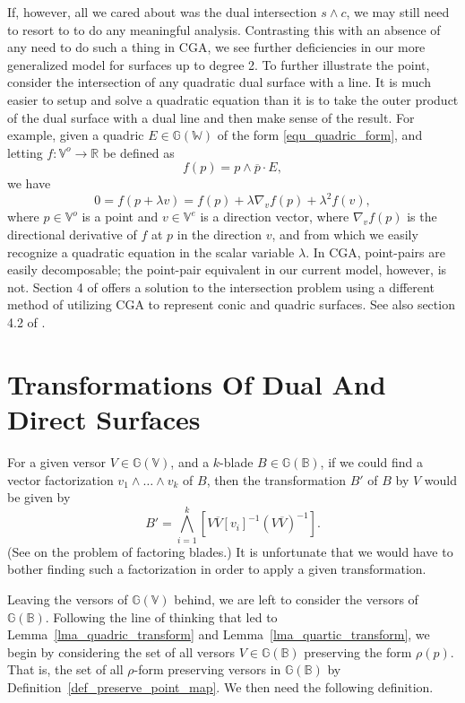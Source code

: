\documentclass{birkjour}
\theoremstyle{definition}
\theoremstyle{remark}
\numberwithin{equation}{section}
\newcommand{\G}{\mathbb{G}}
\newcommand{\V}{\mathbb{V}}
\newcommand{\W}{\mathbb{W}}
\newcommand{\R}{\mathbb{R}}
\newcommand{\B}{\mathbb{B}}
\begin{document}
If, however, all we cared about was the dual intersection $s\wedge c$, we may still
need to resort to \cite{Wang03} to do any meaningful analysis.
Contrasting this with an absence of any need to do such a thing in CGA,
we see further deficiencies in our more generalized model for surfaces
up to degree 2.
To further illustrate the point, consider the intersection of any quadratic dual surface with a line.
It is much easier to setup and solve a quadratic equation than it is to take the outer
product of the dual surface with a dual line and then make sense of the result.  For example,
given a quadric $E\in\G(\W)$ of the form \eqref{equ_quadric_form}, and
letting $f:\V^o\to\R$ be defined as
\begin{equation}
f(p)=p\wedge\overline{p}\cdot E,
\end{equation}
we have
\begin{equation}
0 = f(p+\lambda v) = f(p)+\lambda \nabla_v f(p)+\lambda^2 f(v),
\end{equation}
where $p\in\V^o$ is a point and $v\in\V^e$ is a direction vector, where
$\nabla_v f(p)$ is the directional derivative of $f$ at $p$ in the direction $v$, and from
which we easily recognize a quadratic equation in the scalar variable $\lambda$.
In CGA, point-pairs are easily decomposable; the point-pair equivalent
in our current model, however, is not.  Section 4 of \cite{Lasenby05} offers
a solution to the intersection problem using a different method of utilizing CGA to
represent conic and quadric surfaces.  See also section 4.2 of \cite{Wareham05}.

\section{Transformations Of Dual And Direct Surfaces}

For a given versor $V\in\G(\V)$,
and a $k$-blade $B\in\G(\B)$, if we could find a vector factorization $v_1\wedge\dots\wedge v_k$
of $B$, then the transformation $B'$ of $B$ by $V$ would be given by
\begin{equation}
B' = \bigwedge_{i=1}^k [V\overline{V}[v_i]^{-1}(V\overline{V})^{-1}].
\end{equation}
(See \cite{Fontijne10} on the problem of factoring blades.)  It is unfortunate that we would
have to bother finding such a factorization in order to apply a given transformation.

Leaving the versors of $\G(\V)$ behind, we are left to consider the versors of $\G(\B)$.
Following the line of thinking that led to Lemma~\ref{lma_quadric_transform} and 
Lemma~\ref{lma_quartic_transform}, we begin by
considering the set of all versors $V\in\G(\B)$ preserving the form $\rho(p)$.
That is, the set of all $\rho$-form preserving versors in $\G(\B)$ by
Definition~\ref{def_preserve_point_map}.
We then need the following definition.
\end{document}
